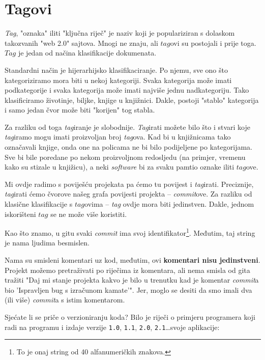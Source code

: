 \chapter*{Tagovi}

\emph{Tag}, "oznaka" iliti "ključna riječ" je naziv koji je populariziran s dolaskom takozvanih "web 2.0" sajtova. 
Mnogi ne znaju, ali $tag$ovi su postojali i prije toga. 
$Tag$ je jedan od načina klasifikacije dokumenata.

Standardni način je hijerarhijsko klasifikaciranje.
Po njemu, sve ono što kategoriziramo mora biti u nekoj kategoriji.
Svaka kategorija može imati podkategorije i svaka kategorija može imati najviše jednu nadkategoriju.
Tako klasificiramo životinje, biljke, knjige u knjižnici.
Dakle, postoji "stablo" kategorija i samo jedan čvor može biti "korijen" tog stabla.

Za razliku od toga \emph{tag}iranje je slobodnije.
\emph{Tag}irati možete bilo što i stvari koje \emph{tag}iramo mogu imati proizvoljan broj \emph{tag}ova.
Kad bi u knjižnicama tako označavali knjige, onda one na policama ne bi bilo podijeljene po kategorijama.
Sve bi bile poredane po nekom proizvoljnom redosljedu (na primjer, vremenu kako su stizale u knjižicu), a neki \emph{software} bi za svaku pamtio oznake iliti $tag$ove.

Mi ovdje radimo s poviješću projekata pa ćemo tu povijest i \emph{tag}irati.
Preciznije, \emph{tag}irati ćemo čvorove našeg grafa povijesti projekta -- \emph{commit}ove.
Za razliku od klasične klasifikacije s $tag$ovima -- \emph{tag} ovdje mora biti jedinstven.
Dakle, jednom iskorišteni $tag$ se ne može više koristiti.

Kao što znamo, u gitu svaki \emph{commit} ima svoj identifikator\footnote{To je onaj string od 40 alfanumeričkih znakova.}. 
Međutim, taj string je nama ljudima besmislen.

Nama su smisleni komentari uz kod, međutim, ovi \textbf{komentari nisu jedinstveni}.
Projekt možemo pretraživati po riječima iz komentara, ali nema smisla od gita tražiti "Daj mi stanje projekta kakvo je bilo u trenutku kad je komentar \emph{commit}a bio 'Ispravljen bug s izračunom kamate'".
Jer, moglo se desiti da smo imali dva (ili više) \emph{commit}a s istim komentarom.

Sjećate li se priče o verzioniranju koda?
Bilo je riječi o primjeru programera koji radi na programu i izdaje verzije \verb+1.0+, \verb+1.1+, \verb+2.0+, \verb+2.1+\dots svoje aplikacije:

